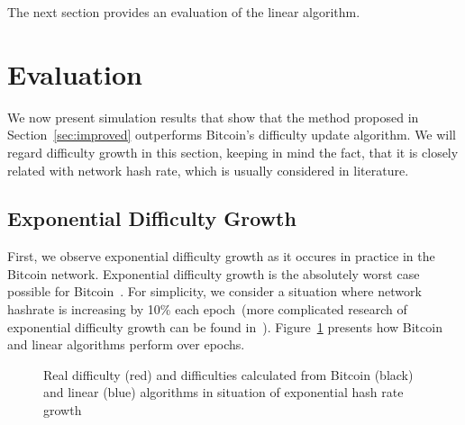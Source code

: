 \documentclass[]{llncs}
\begin{document}
The next section provides an evaluation of the linear algorithm.

\section{Evaluation}
\label{sec:sim}

We now present simulation results that show that the  method proposed in Section~\ref{sec:improved} outperforms Bitcoin's difficulty update algorithm.
We will regard difficulty growth in this section, keeping in mind the fact, that it is closely related with network hash rate, which is usually considered in literature.

\subsection{Exponential Difficulty Growth}
\label{sec:experiment}
First, we observe exponential difficulty growth as it occures in practice in the Bitcoin network. Exponential difficulty growth is the absolutely worst case possible for Bitcoin~\cite{kraft2015difficulty}.
For simplicity, we consider a situation where network hashrate is increasing by 10\% each epoch~(more complicated research of exponential difficulty growth can be found in~\cite{kraft2015difficulty}).
Figure~\ref{fig:exp} presents how Bitcoin and linear algorithms perform over epochs.

\begin{figure}[h]
\caption{Real difficulty (red) and difficulties calculated from Bitcoin (black) and linear (blue) algorithms in situation of exponential hash rate growth}
\label{fig:exp}
\end{figure}
\end{document}
